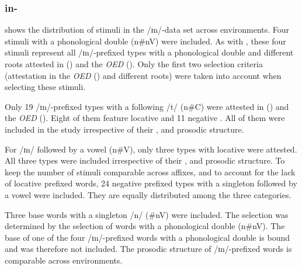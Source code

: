 \subsubsection{in-}

 shows the distribution of  stimuli in the /ɪn/-data set across environments. 
Four stimuli with a phonological double ({n\#nV}) were included. As with , these four stimuli represent all /ɪn/-prefixed types with a phonological double and different roots attested in  (\citealt{Davies.20082014}) and the \textit{OED} (\citealt{OED.2013}). Only the first two selection criteria (attestation in the \textit{OED} (\citealt{OED.2013}) and different roots) were taken into account when selecting these stimuli. 



Only 19 /ɪn/-prefixed types with a following /t/ ({n\#C}) were attested  in  (\citealt{Davies.20082014}) and the \textit{OED} (\citealt{OED.2013}).  Eight of them feature locative  and 11 negative . All of them were included in the study irrespective of their ,  and prosodic structure. 

For /ɪn/ followed by a vowel ({n\#V}), only three types with locative  were attested. All three types were included irrespective of their ,  and prosodic structure. 
To keep the number of stimuli comparable across affixes, and to account for the lack of locative prefixed words, 24 negative prefixed types with a singleton followed by a vowel were included. They are equally distributed among the three  categories.  



Three base words with a singleton /n/ ({\#nV}) were included. The selection was determined by the selection of words with a phonological double ({n\#nV}). The base of one of the four /ɪn/-prefixed words with a phonological double is bound and was therefore not included. 
The prosodic structure of /ɪn/-prefixed words is comparable across environments.


